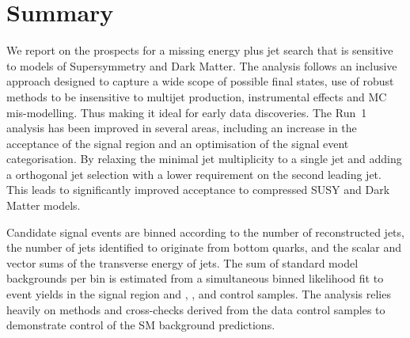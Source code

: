 \section{Summary}
\label{sec:summary}

We report on the prospects for a missing energy plus jet search that
is sensitive to models of Supersymmetry and Dark Matter.
The analysis follows an inclusive approach designed to capture a wide
scope of possible final states, use of robust methods to be
insensitive to multijet production, instrumental effects and MC
mis-modelling. Thus making it ideal for early data discoveries.
The Run~1 analysis has been improved in several areas, including an
increase in the acceptance of the signal region and an optimisation of
the signal event categorisation. By relaxing the minimal jet multiplicity 
to a single jet and adding a orthogonal jet selection with a lower 
\Pt requirement on the second leading jet. This leads to 
significantly improved acceptance to compressed SUSY and Dark Matter
models.

Candidate signal events are binned according to the number of
reconstructed jets, the number of jets identified to originate from
bottom quarks, and the scalar and vector sums of the transverse energy
of jets. The sum of standard model backgrounds per bin is estimated
from a simultaneous binned likelihood fit to event yields in the
signal region and \mj, \mmj, and \gj control samples. The
analysis relies heavily on methods and cross-checks derived from the
data control samples to demonstrate control of the SM background
predictions. 


